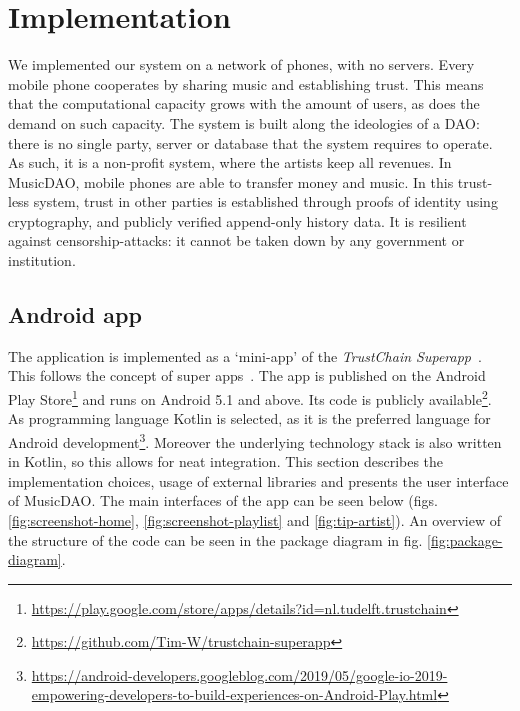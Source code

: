 \chapter{Implementation}
We implemented our system on a network of phones, with no servers. Every mobile phone cooperates by sharing music and establishing trust. This means that the computational capacity grows with the amount of users, as does the demand on such capacity. The system is built along the ideologies of a DAO: there is no single party, server or database that the system requires to operate. As such, it is a non-profit system, where the artists keep all revenues. In MusicDAO, mobile phones are able to transfer money and music. In this trust-less system, trust in other parties is established through proofs of identity using cryptography, and publicly verified append-only history data. It is resilient against censorship-attacks: it cannot be taken down by any government or institution.

\section{Android app}
The application is implemented as a `mini-app' of the \textit{TrustChain Superapp}~\citep{mattskala2020}. This follows the concept of super apps~\citep{kpmg2019superapps}. The app is published on the Android Play Store\footnote{\url{https://play.google.com/store/apps/details?id=nl.tudelft.trustchain}} and runs on Android 5.1 and above. Its code is publicly available\footnote{\url{https://github.com/Tim-W/trustchain-superapp}}. As programming language Kotlin is selected, as it is the preferred language for Android development\footnote{\url{https://android-developers.googleblog.com/2019/05/google-io-2019-empowering-developers-to-build-experiences-on-Android-Play.html}}. Moreover the underlying technology stack is also written in Kotlin, so this allows for neat integration. This section describes the implementation choices, usage of external libraries and presents the user interface of MusicDAO. The main interfaces of the app can be seen below (figs. \ref{fig:screenshot-home}, \ref{fig:screenshot-playlist} and \ref{fig:tip-artist}). An overview of the structure of the code can be seen in the package diagram in fig. \ref{fig:package-diagram}.

